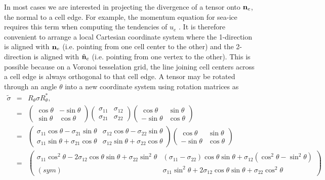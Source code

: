 \documentclass[11pt]{report}
\begin{document}
In most cases we are interested in projecting the divergence of a tensor onto ${\bf n}_e$, the normal to a cell edge.  For example, the momentum equation for sea-ice requires this term when computing the tendencies of $u_e$ \cite[section 3.4]{CICE_manual_4.1}.  It is therefore convenient to arrange a local Cartesian coordinate system where the 1-direction is aligned with ${\bf n}_e$ (i.e. pointing from one cell center to the other) and the 2-direction is aligned with $\tilde{\bf n}_e$ (i.e. pointing from one vertex to the other).  This is possible because on a Voronoi tesselation grid, the line joining cell centers across a cell edge is always orthogonal to that cell edge.  A tensor may be rotated through an angle $\theta$ into a new coordinate system using rotation matrices as
\begin{eqnarray}
\label{rotate sigma 2D}
\tilde{\sigma} &=& R_\theta \sigma R_\theta^*,\\
&=& 
\left(\begin{array}{cc} \cos{\theta}& -\sin{\theta} \\
                        \sin{\theta}&  \cos{\theta} 
 \end{array} \right)
\left(\begin{array}{cc} \sigma_{11} & \sigma_{12} \\
                        \sigma_{21} & \sigma_{22} 
 \end{array} \right)
\left(\begin{array}{cc} \cos{\theta}&  \sin{\theta} \\
                       -\sin{\theta}&  \cos{\theta} 
 \end{array} \right) \\
&=& 
\left(\begin{array}{cc} \sigma_{11}\cos{\theta} - \sigma_{21}\sin{\theta} &
                        \sigma_{12}\cos{\theta} - \sigma_{22}\sin{\theta} \\
                        \sigma_{11}\sin{\theta} + \sigma_{21}\cos{\theta} &
                        \sigma_{12}\sin{\theta} + \sigma_{22}\cos{\theta} 
 \end{array} \right)
\left(\begin{array}{cc} \cos{\theta}&  \sin{\theta} \\
                       -\sin{\theta}&  \cos{\theta} 
 \end{array} \right) \\
&=& 
\left(\begin{array}{cc} 
  \sigma_{11}\cos^2{\theta} - 2\sigma_{12}\cos{\theta}\sin{\theta} + \sigma_{22}\sin^2{\theta} &
  (\sigma_{11}- \sigma_{22})\cos{\theta}\sin{\theta} + \sigma_{12}\left(\cos^2{\theta} - \sin^2{\theta} \right)  \\
(sym) &
  \sigma_{11}\sin^2{\theta} + 2\sigma_{12}\cos{\theta}\sin{\theta} + \sigma_{22}\cos^2{\theta} 
 \end{array} \right)
\end{eqnarray}
\end{document}
